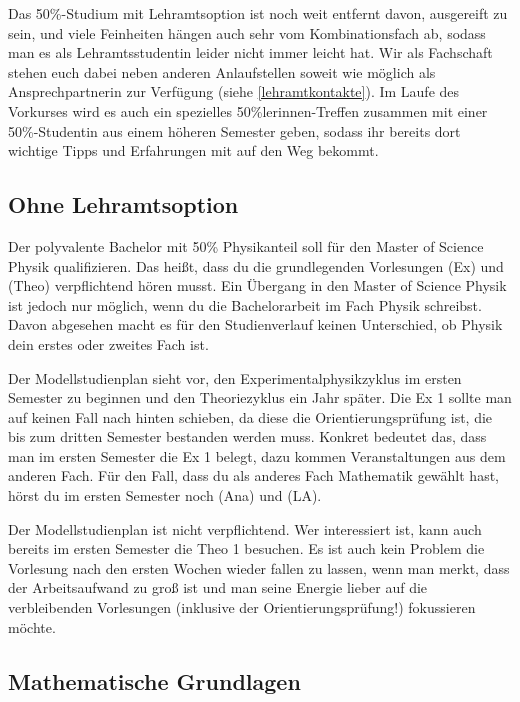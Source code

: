 Das 50\%-Studium mit Lehramtsoption ist noch weit entfernt davon, ausgereift zu sein, und viele Feinheiten hängen auch sehr vom Kombinationsfach ab, sodass man es als Lehramtsstudentin leider nicht immer leicht hat. Wir als Fachschaft stehen euch dabei neben anderen Anlaufstellen soweit wie möglich als Ansprechpartnerin zur Verfügung (siehe \autoref{lehramtkontakte}). Im Laufe des Vorkurses wird es auch ein spezielles 50\%lerinnen-Treffen zusammen mit einer 50\%-Studentin aus einem höheren Semester geben, sodass ihr bereits dort wichtige Tipps und Erfahrungen mit auf den Weg bekommt.

\subsection{Ohne Lehramtsoption}

Der polyvalente Bachelor mit 50\% Physikanteil soll für den Master of Science Physik qualifizieren. Das heißt, dass du die grundlegenden Vorlesungen  (\gls{Ex}) und  (\gls{Theo}) verpflichtend hören musst. Ein Übergang in den Master of Science Physik ist jedoch nur möglich, wenn du die Bachelorarbeit im Fach Physik schreibst. Davon abgesehen macht es für den Studienverlauf keinen Unterschied, ob Physik dein erstes oder zweites Fach ist.

Der Modellstudienplan sieht vor, den Experimentalphysikzyklus im ersten Semester zu beginnen und den Theoriezyklus ein Jahr später. Die \gls{Ex} 1 sollte man auf keinen Fall nach hinten schieben, da diese die Orientierungsprüfung ist, die bis zum dritten Semester bestanden werden muss.
Konkret bedeutet das, dass man im ersten Semester die \gls{Ex} 1 belegt, dazu kommen Veranstaltungen aus dem anderen Fach.
Für den Fall, dass du als anderes Fach Mathematik gewählt hast, hörst du im ersten Semester noch  (\gls{Ana}) und  (\gls{LA}).

Der Modellstudienplan ist nicht verpflichtend. Wer interessiert ist, kann auch bereits im ersten Semester die \gls{Theo} 1 besuchen. Es ist auch kein Problem die Vorlesung nach den ersten Wochen wieder fallen zu lassen, wenn man merkt, dass der Arbeitsaufwand zu groß ist und man seine Energie lieber auf die verbleibenden Vorlesungen (inklusive der Orientierungsprüfung!) fokussieren möchte.

\subsection{Mathematische Grundlagen}
\label{mathegrundlagen}

